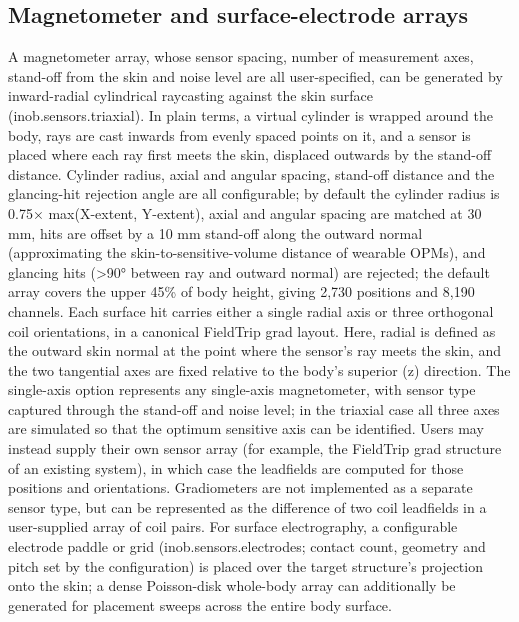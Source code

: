 \documentclass[11pt]{article}
\newcommand{\revised}[1]{#1}
\begin{document}
\subsection{Magnetometer and surface-electrode
arrays}\label{magnetometer-and-surface-electrode-arrays}

A magnetometer array, whose sensor spacing, number of measurement axes,
stand-off from the skin and noise level are all user-specified, can be
generated by inward-radial cylindrical raycasting against the skin
surface (inob.sensors.triaxial). In plain terms, a virtual cylinder is
wrapped around the body, rays are cast inwards from evenly spaced points
on it, and a sensor is placed where each ray first meets the skin,
displaced outwards by the stand-off distance. Cylinder radius, axial and
angular spacing, stand-off distance and the glancing-hit rejection angle
are all configurable; by default the cylinder radius is 0.75×
max(X-extent, Y-extent), axial and angular spacing are matched at 30 mm,
hits are offset by a 10 mm stand-off along the outward normal
(approximating the skin-to-sensitive-volume distance of wearable OPMs),
and glancing hits (\textgreater90° between ray and outward normal) are
rejected\revised{; the default array covers the upper 45\% of body height, giving
2,730 positions and 8,190 channels}. Each surface hit carries either a single radial axis or three
orthogonal coil orientations, in a canonical FieldTrip grad layout.
Here, radial is defined as the \revised{outward} skin normal at the point where the
sensor's ray meets the skin, and the two tangential axes
are fixed relative to the body's superior (z) direction.
The single-axis option represents any single-axis magnetometer, with
sensor type captured through the stand-off and noise level; in the
triaxial case all three axes are simulated so that the optimum sensitive
axis can be identified. Users may instead supply their own sensor array
(for example, the FieldTrip grad structure of an existing system), in
which case the leadfields are computed for those positions and
orientations. Gradiometers are not implemented as a separate sensor
type, but can be represented as the difference of two coil leadfields in
a user-supplied array of coil pairs. For surface electrography, a
configurable electrode paddle or grid (inob.sensors.electrodes; contact
count, geometry and pitch set by the configuration) is placed over the
target structure's projection onto the skin; a dense
Poisson-disk whole-body array can additionally be generated for
placement sweeps across the entire body surface.
\end{document}

